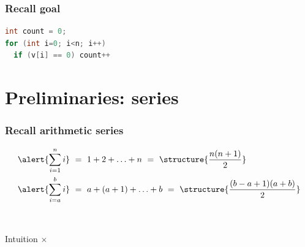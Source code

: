 \documentclass[aspectratio=169]{beamer}
\begin{document}
\begin{frame}[fragile]\frametitle{Recall goal}

\begin{lstlisting}[language=C++,linewidth=50mm]
int count = 0;
for (int i=0; i<n; i++)
  if (v[i] == 0) count++
\end{lstlisting}    

\end{frame}


\section{Preliminaries: series}


\begin{frame}\frametitle{Recall arithmetic series}
    
\begin{align*}
  \alert{\sum_{i=1}^n i} &~=~ 1 + 2 + \ldots + n ~=~ \structure{\frac{n(n+1)}{2}}
  \\
  \alert{\sum_{i=a}^b i} &~=~ a + (a+1) + \ldots + b ~=~
    \structure{\frac{(b-a+1)(a+b)}{2}}
\end{align*}

~\\[8mm]

\begin{block}{Intuition}
\centering
{} $\times$   
\end{block}
\end{frame}
\end{document}
